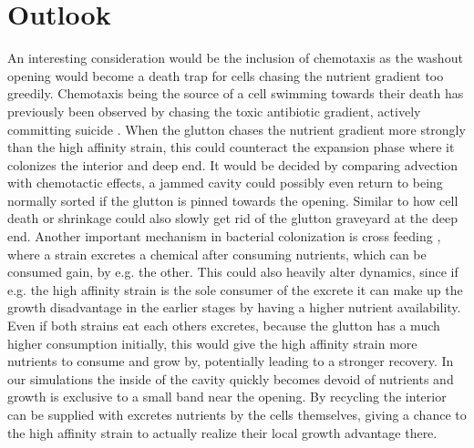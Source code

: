 \documentclass[11pt,a4paper]{report}
\begin{document}
	\section{Outlook}
	An interesting consideration would be the inclusion of chemotaxis as the washout opening would become a death trap for cells chasing the nutrient gradient too greedily. Chemotaxis being the source of a cell swimming towards their death has previously been observed by chasing the toxic antibiotic gradient, actively committing suicide \cite{suicide}. When the glutton chases the nutrient gradient more strongly than the high affinity strain, this could counteract the expansion phase where it colonizes the interior and deep end. It would be decided by comparing advection with chemotactic effects, a jammed cavity could possibly even return to being normally sorted if the glutton is pinned towards the opening. Similar to how cell death or shrinkage could also slowly get rid of the glutton graveyard at the deep end. Another important mechanism in bacterial colonization is cross feeding \cite{cross}, where a strain excretes a chemical after consuming nutrients, which can be consumed gain, by e.g. the other. This could also heavily alter dynamics, since if e.g. the high affinity strain is the sole consumer of the excrete it can make up the growth disadvantage in the earlier stages by having a higher nutrient availability. Even if both strains eat each others excretes, because the glutton has a much higher consumption initially, this would give the high affinity strain more nutrients to consume and grow by, potentially leading to a stronger recovery. In our simulations the inside of the cavity quickly becomes devoid of nutrients and growth is exclusive to a small band near the opening. By recycling the interior can be supplied with excretes nutrients by the cells themselves, giving a chance to the high affinity strain to actually realize their local growth advantage there. 
	
\end{document}
